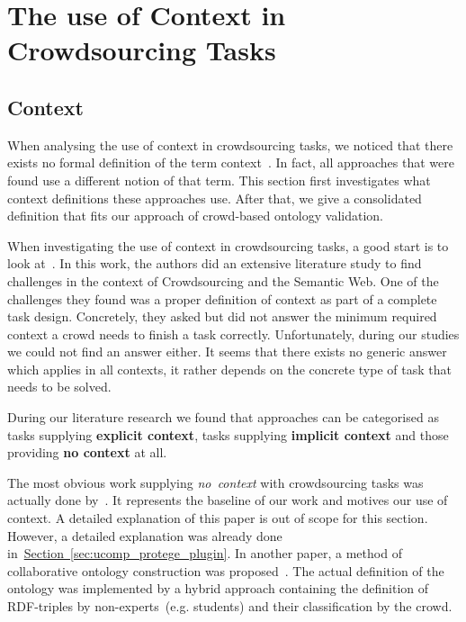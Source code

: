 \section{The use of Context in Crowdsourcing Tasks}
% 

\subsection{Context}\label{sec:context_in_crowdsourcing_tasks_context}
When analysing the use of context in crowdsourcing tasks, we noticed that there exists no formal definition of the term \guillemotright context\guillemotleft~. In fact, all approaches that were found use a different notion of that term. 
This section first investigates what context definitions these approaches use. After that, we give a consolidated definition that fits our approach of crowd-based ontology validation.

When investigating the use of context in crowdsourcing tasks, a good start is to look at~\cite{sarasua2015crowdsourcing}. In this work, the authors did an extensive literature study to find challenges in the context of Crowdsourcing and the Semantic Web. One of the challenges they found was a proper definition of context as part of a complete task design. Concretely, they asked but did not answer the minimum required context a crowd needs to finish a task correctly. Unfortunately, during our studies we could not find an answer either. It seems that there exists no generic answer which applies in all contexts, it rather depends on the concrete type of task that needs to be solved. 

During our literature research we found that approaches can be categorised as tasks supplying \textbf{explicit context}, tasks supplying \textbf{implicit context} and those providing \textbf{no context} at all. 

The most obvious work supplying \emph{no~context} with crowdsourcing tasks was actually done by~\cite{wohlgenannt2016}. It represents the baseline of our work and motives our use of context. A detailed explanation of this paper is out of scope for this section. However, a detailed explanation was already done in~\hyperref[sec:ucomp_protege_plugin]{Section~\ref*{sec:ucomp_protege_plugin}}. In another paper, a method of collaborative ontology construction was proposed~\cite{zhitomirsky2017}. The actual definition of the ontology was implemented by a hybrid approach containing the definition of RDF-triples by non-experts~(e.g. students) and their classification by the crowd.

